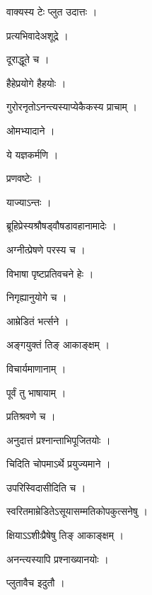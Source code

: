 \documentclass[10pt, openany]{book}
\begin{document}
\noindent वाक्यस्य टेः प्लुत उदात्तः ।

\noindent प्रत्यभिवादेअशूद्रे ।

\noindent दूराद्धूते च ।

\noindent हैहेप्रयोगे हैहयोः ।

\noindent गुरोरनृतोऽनन्त्यस्याप्येकैकस्य प्राचाम् ।

\noindent ओमभ्यादाने ।

\noindent ये यज्ञकर्मणि ।

\noindent प्रणवष्टेः ।

\noindent याज्याऽन्तः ।

\noindent ब्रूहिप्रेस्यश्रौषड्वौषडावहानामादेः ।

\noindent अग्नीत्प्रेषणे परस्य च ।

\noindent विभाषा पृष्टप्रतिवचने हेः ।

\noindent निगृह्यानुयोगे च ।

\noindent आम्रेडितं भर्त्सने ।

\noindent अङ्गयुक्तं तिङ् आकाङ्क्षम् ।

\noindent विचार्यमाणानाम् ।

\noindent पूर्वं तु भाषायाम् ।

\noindent प्रतिश्रवणे च ।

\noindent अनुदात्तं प्रश्नान्ताभिपूजितयोः ।

\noindent चिदिति चोपमाऽर्थे प्रयुज्यमाने ।

\noindent उपरिस्विदासीदिति च ।

\noindent स्वरितमाम्रेडितेऽसूयासम्मतिकोपकुत्सनेषु ।

\noindent क्षियाऽऽशीःप्रैषेषु तिङ् आकाङ्क्षम् ।

\noindent अनन्त्यस्यापि प्रश्नाख्यानयोः ।

\noindent प्लुतावैच इदुतौ ।
\end{document}
